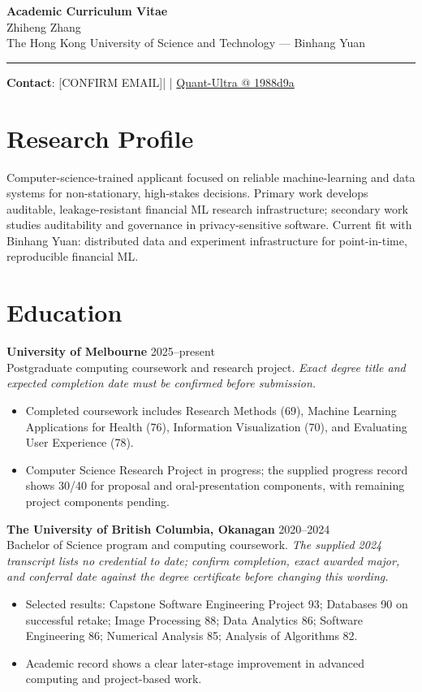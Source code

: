 \documentclass[11pt]{article}
\makeatletter
\newcommand{\ApplicantName}{Zhiheng Zhang}
\newcommand{\ApplicantEmail}{[CONFIRM EMAIL]}
\newcommand{\ApplicantPhone}{[CONFIRM PHONE]}
\newcommand{\ApplicantGitHub}{\href{https://github.com/zhiheng-zhang-Mera/Quant-Ultra/tree/1988d9a8530da91a8158de864d098ea869098923}{Quant-Ultra @ 1988d9a}}
\makeatother
\begin{document}
\begin{center}
{\LARGE\bfseries Academic Curriculum Vitae}\\[0.25em]
{\large \ApplicantName}\\
The Hong Kong University of Science and Technology --- Binhang Yuan
\end{center}
\vspace{0.35em}\hrule\vspace{0.65em}

\textbf{Contact}: \ApplicantEmail\quad | \quad \ApplicantPhone\quad | \quad \ApplicantGitHub

\section*{Research Profile}
Computer-science-trained applicant focused on reliable machine-learning and data systems for non-stationary, high-stakes decisions. Primary work develops auditable, leakage-resistant financial ML research infrastructure; secondary work studies auditability and governance in privacy-sensitive software. Current fit with Binhang Yuan: distributed data and experiment infrastructure for point-in-time, reproducible financial ML.

\section*{Education}
\textbf{University of Melbourne} \hfill 2025--present\\
Postgraduate computing coursework and research project. \textit{Exact degree title and expected completion date must be confirmed before submission.}
\begin{itemize}
\item Completed coursework includes Research Methods (69), Machine Learning Applications for Health (76), Information Visualization (70), and Evaluating User Experience (78).
\item Computer Science Research Project in progress; the supplied progress record shows 30/40 for proposal and oral-presentation components, with remaining project components pending.
\end{itemize}

\textbf{The University of British Columbia, Okanagan} \hfill 2020--2024\\
Bachelor of Science program and computing coursework. \textit{The supplied 2024 transcript lists no credential to date; confirm completion, exact awarded major, and conferral date against the degree certificate before changing this wording.}
\begin{itemize}
\item Selected results: Capstone Software Engineering Project 93; Databases 90 on successful retake; Image Processing 88; Data Analytics 86; Software Engineering 86; Numerical Analysis 85; Analysis of Algorithms 82.
\item Academic record shows a clear later-stage improvement in advanced computing and project-based work.
\end{itemize}
\end{document}
